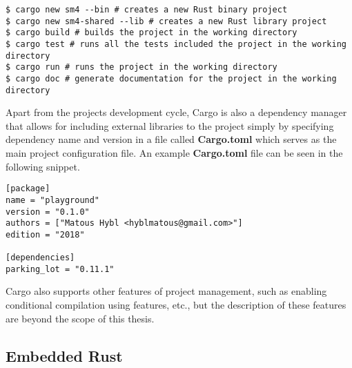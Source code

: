 \begin{lstlisting}
$ cargo new sm4 --bin # creates a new Rust binary project
$ cargo new sm4-shared --lib # creates a new Rust library project
$ cargo build # builds the project in the working directory
$ cargo test # runs all the tests included the project in the working directory
$ cargo run # runs the project in the working directory
$ cargo doc # generate documentation for the project in the working directory
\end{lstlisting}

Apart from the projects development cycle, Cargo is also a dependency manager that allows for including external libraries to the project simply by specifying dependency name and version in a file called \textbf{Cargo.toml} which serves as the main project configuration file.
An example \textbf{Cargo.toml} file can be seen in the following snippet.

\begin{lstlisting}
[package]
name = "playground"
version = "0.1.0"
authors = ["Matous Hybl <hyblmatous@gmail.com>"]
edition = "2018"

[dependencies]
parking_lot = "0.11.1"
\end{lstlisting}

Cargo also supports other features of project management, such as enabling conditional compilation using features, etc., but the description of these features are beyond the scope of this thesis.

\subsection{Embedded Rust}
\label{subsec:embedded_rust}

